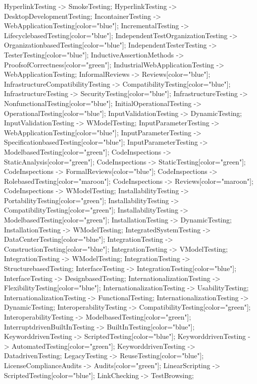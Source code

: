 \documentclass{article}
\begin{document}
{HyperlinkTesting -> SmokeTesting;
HyperlinkTesting -> DesktopDevelopmentTesting;
IncontainerTesting -> WebApplicationTesting[color="blue"];
IncrementalTesting -> LifecyclebasedTesting[color="blue"];
IndependentTestOrganizationTesting -> OrganizationbasedTesting[color="blue"];
IndependentTesterTesting -> TesterTesting[color="blue"];
InductiveAssertionMethods -> ProofsofCorrectness[color="green"];
IndustrialWebApplicationTesting -> WebApplicationTesting;
InformalReviews -> Reviews[color="blue"];
InfrastructureCompatibilityTesting -> CompatibilityTesting[color="blue"];
InfrastructureTesting -> SecurityTesting[color="blue"];
InfrastructureTesting -> NonfunctionalTesting[color="blue"];
InitialOperationalTesting -> OperationalTesting[color="blue"];
InputValidationTesting -> DynamicTesting;
InputValidationTesting -> WModelTesting;
InputParameterTesting -> WebApplicationTesting[color="blue"];
InputParameterTesting -> SpecificationbasedTesting[color="blue"];
InputParameterTesting -> ModelbasedTesting[color="green"];
CodeInspections -> StaticAnalysis[color="green"];
CodeInspections -> StaticTesting[color="green"];
CodeInspections -> FormalReviews[color="blue"];
CodeInspections -> RolebasedTesting[color="maroon"];
CodeInspections -> Reviews[color="maroon"];
CodeInspections -> WModelTesting;
InstallabilityTesting -> PortabilityTesting[color="green"];
InstallabilityTesting -> CompatibilityTesting[color="green"];
InstallabilityTesting -> ModelbasedTesting[color="green"];
InstallationTesting -> DynamicTesting;
InstallationTesting -> WModelTesting;
IntegratedSystemTesting -> DataCenterTesting[color="blue"];
IntegrationTesting -> ConstructionTesting[color="blue"];
IntegrationTesting -> VModelTesting;
IntegrationTesting -> WModelTesting;
IntegrationTesting -> StructurebasedTesting;
InterfaceTesting -> IntegrationTesting[color="blue"];
InterfaceTesting -> DesignbasedTesting;
InternationalizationTesting -> FlexibilityTesting[color="blue"];
InternationalizationTesting -> UsabilityTesting;
InternationalizationTesting -> FunctionalTesting;
InternationalizationTesting -> DynamicTesting;
InteroperabilityTesting -> CompatibilityTesting[color="green"];
InteroperabilityTesting -> ModelbasedTesting[color="green"];
InterruptdrivenBuiltInTesting -> BuiltInTesting[color="blue"];
KeyworddrivenTesting -> ScriptedTesting[color="blue"];
KeyworddrivenTesting -> AutomatedTesting[color="green"];
KeyworddrivenTesting -> DatadrivenTesting;
LegacyTesting -> ReuseTesting[color="blue"];
LicenseComplianceAudits -> Audits[color="green"];
LinearScripting -> ScriptedTesting[color="blue"];
LinkChecking -> TestBrowsing;
}
\end{document}
